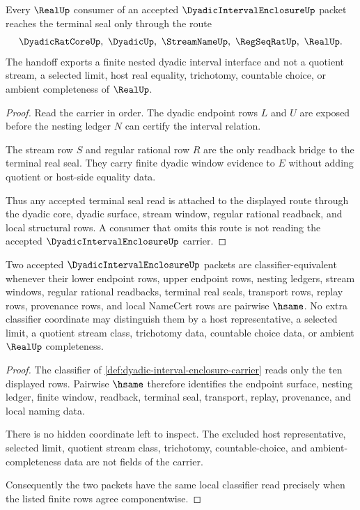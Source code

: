 \begin{theorem}
\label{thm:dyadic-interval-enclosure-real-seal-handoff}
Every $\RealUp$ consumer of an accepted $\DyadicIntervalEnclosureUp$ packet reaches the terminal seal only through the route
$$
\DyadicRatCoreUp,\ \DyadicUp,\ \StreamNameUp,\ \RegSeqRatUp,\ \RealUp .
$$
The handoff exports a finite nested dyadic interval interface and not a quotient stream, a selected limit, host real equality, trichotomy, countable choice, or ambient completeness of $\RealUp$.
\end{theorem}
\begin{proof}
Read the carrier in order. The dyadic endpoint rows $L$ and $U$ are exposed before the nesting ledger $N$ can certify the interval relation.

The stream row $S$ and regular rational row $R$ are the only readback bridge to the terminal real seal. They carry finite dyadic window evidence to $E$ without adding quotient or host-side equality data.

Thus any accepted terminal seal read is attached to the displayed route through the dyadic core, dyadic surface, stream window, regular rational readback, and local structural rows. A consumer that omits this route is not reading the accepted $\DyadicIntervalEnclosureUp$ carrier.
\end{proof}

\begin{theorem}
\label{thm:dyadic-interval-enclosure-classifier-stability}
Two accepted $\DyadicIntervalEnclosureUp$ packets are classifier-equivalent whenever their lower endpoint rows, upper endpoint rows, nesting ledgers, stream windows, regular rational readbacks, terminal real seals, transport rows, replay rows, provenance rows, and local NameCert rows are pairwise $\hsame$. No extra classifier coordinate may distinguish them by a host representative, a selected limit, a quotient stream class, trichotomy data, countable choice data, or ambient $\RealUp$ completeness.
\end{theorem}
\begin{proof}
The classifier of \autoref{def:dyadic-interval-enclosure-carrier} reads only the ten displayed rows. Pairwise $\hsame$ therefore identifies the endpoint surface, nesting ledger, finite window, readback, terminal seal, transport, replay, provenance, and local naming data.

There is no hidden coordinate left to inspect. The excluded host representative, selected limit, quotient stream class, trichotomy, countable-choice, and ambient-completeness data are not fields of the carrier.

Consequently the two packets have the same local classifier read precisely when the listed finite rows agree componentwise.
\end{proof}

